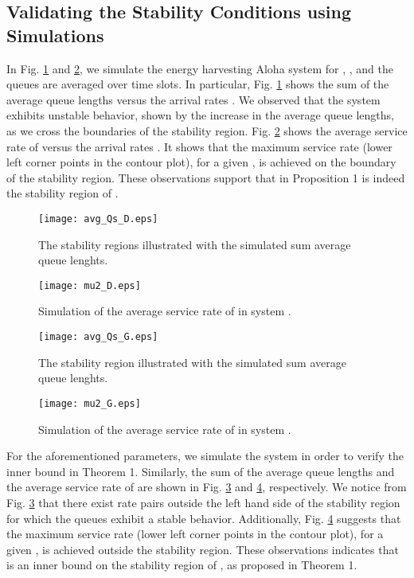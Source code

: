 \documentclass[draftcls,12pt,onecolumn]{IEEEtran}
\begin{document}
\subsection{Validating the Stability Conditions using Simulations} \label{subsec: valid}
In Fig. \ref{fig: eval avg_Qs D} and \ref{fig: eval mu2 D}, we simulate the energy harvesting Aloha system  for , ,  and the queues are averaged over  time slots. In particular, Fig. \ref{fig: eval avg_Qs D} shows the sum of the average queue lengths  versus the arrival rates . We observed that the system exhibits unstable behavior, shown by the increase in the average queue lengths, as we cross the boundaries of the stability region. Fig. \ref{fig: eval mu2 D} shows the  average service rate of  versus the arrival rates . It shows that the maximum service rate (lower left corner points in the contour plot), for a given , is achieved on the boundary of the stability region. These observations support that  in Proposition 1 is indeed the stability region of .\\ \begin{figure}[t]
\texttt{[image: avg\_Qs\_D.eps]} 
\centering
\caption{The stability regions  illustrated with the simulated sum average queue lenghts. }\label{fig: eval avg_Qs D}
\end{figure}
\begin{figure}[h]
\texttt{[image: mu2\_D.eps]} 
\centering
\caption{Simulation of the average service rate of  in system .}\label{fig: eval mu2 D}
\end{figure}
\begin{figure}[t]
\texttt{[image: avg\_Qs\_G.eps]} 
\centering
\caption{The stability region  illustrated with the simulated sum average queue lenghts. }\label{fig: eval avg_Qs G}
\end{figure}
\begin{figure}
\texttt{[image: mu2\_G.eps]} 
\centering
\caption{Simulation of the average service rate of  in system .}\label{fig: eval mu2 G}
\end{figure}
\indent For the aforementioned parameters, we simulate the system  in order to verify the inner bound in Theorem 1. Similarly, the sum of the average queue lengths and the average service rate of  are shown in Fig. \ref{fig: eval avg_Qs G} and \ref{fig: eval mu2 G}, respectively. We notice from Fig. \ref{fig: eval avg_Qs G} that there exist rate pairs outside the left hand side of the stability region for which the queues exhibit a stable behavior. Additionally, Fig. \ref{fig: eval mu2 G} suggests that the maximum service rate (lower left corner points in the contour plot), for a given , is achieved outside the stability region. These observations indicates that  is an inner bound on the stability region of , as proposed in Theorem 1. \\
\end{document}

